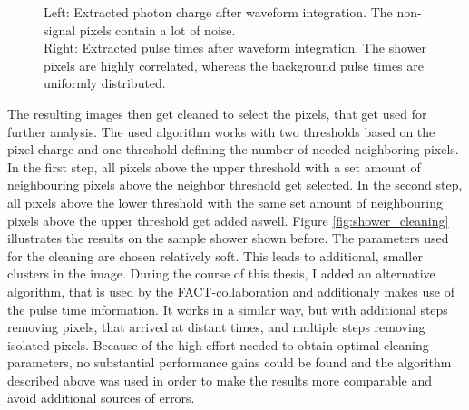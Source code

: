 \begin{figure}
\begin{subfigure}{.45\textwidth}
	\end{subfigure}
	\caption{
		Left: Extracted photon charge after waveform integration.
        The non-signal pixels contain a lot of noise. \\
		Right: Extracted pulse times after waveform integration.
        The shower pixels are highly correlated, whereas the background pulse times
        are uniformly distributed.}
	\label{fig:shower_raw}
\end{figure}


The resulting images then get cleaned to select the pixels,
that get used for further analysis.
The used algorithm works with two thresholds based on the 
pixel charge and one threshold defining the number of needed neighboring pixels.
In the first step, all pixels above the upper threshold with a set amount of neighbouring 
pixels above the neighbor threshold get selected.
In the second step, all pixels above the lower threshold with the same set amount of neighbouring pixels
above the upper threshold get added aswell.
Figure \ref{fig:shower_cleaning} illustrates the results on the sample shower shown before.
The parameters used for the cleaning are chosen relatively soft. This leads to
additional, smaller clusters in the image.
During the course of this thesis, I added an alternative algorithm, that is used by the FACT-collaboration 
and additionaly makes use of the pulse time information.
It works in a similar way, but with additional steps removing pixels, that arrived
at distant times, and multiple steps removing isolated pixels.
Because of the high effort needed to obtain optimal cleaning parameters,
no substantial performance gains could be found and the algorithm described above was 
used in order to make the results more comparable and avoid additional sources of errors.

